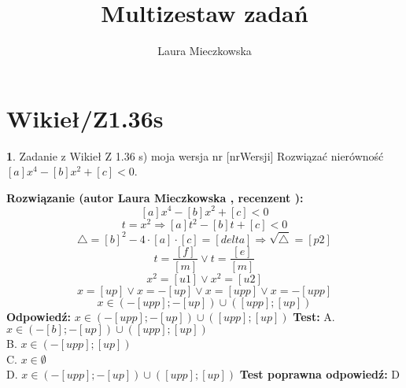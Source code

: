 \documentclass[12pt, a4paper]{article}
\title{Multizestaw zadań}
\author{Laura Mieczkowska}
\date{}
\theoremstyle{definition} %
\newtheorem{zad}{}
\newcommand{\kategoria}[1]{\section{#1}} %
\newcommand{\zadStart}[1]{\begin{zad}#1\newline} %
\newcommand{\zadStop}{\end{zad}}   %
\newcommand{\rozwStart}[2]{\noindent \textbf{Rozwiązanie (autor #1 , recenzent #2): }\newline} %
\newcommand{\odpStart}{\noindent \textbf{Odpowiedź:}\newline}    %
\newcommand{\odpStop}{\newline}                                             %
\newcommand{\testStart}{\noindent \textbf{Test:}\newline} %
\newcommand{\testStop}{\newline} %
\newcommand{\kluczStart}{\noindent \textbf{Test poprawna odpowiedź:}\newline} %
\newcommand{\kluczStop}{\newline} %
\begin{document}
\maketitle


\kategoria{Wikieł/Z1.36s}
\zadStart{Zadanie z Wikieł Z 1.36 s) moja wersja nr [nrWersji]}
Rozwiązać nierówność $[a]x^4-[b]x^2+[c]<0$.
\zadStop
\rozwStart{Laura Mieczkowska}{}
$$[a]x^4-[b]x^2+[c]<0$$
$$t=x^2 \Rightarrow [a]t^2-[b]t+[c]<0$$ 
$$\triangle=[b]^2-4\cdot[a]\cdot [c]=[delta] \Rightarrow \sqrt{\triangle}=[p2]$$
$$t=\frac{[f]}{[m]} \vee t=\frac{[e]}{[m]}$$
$$x^2=[u1] \vee x^2=[u2]$$
$$x=[up] \vee x=-[up] \vee x=[upp] \vee x=-[upp]$$
$$x\in(-[upp];-[up])\cup([upp];[up])$$
\odpStart
$x\in(-[upp];-[up])\cup([upp];[up])$
\odpStop
\testStart
A. $x\in(-[b];-[up])\cup([upp];[up])$ \\
B. $x\in(-[upp];[up])$ \\
C. $x\in\emptyset$ \\
D. $x\in(-[upp];-[up])\cup([upp];[up])$ 
\testStop
\kluczStart
D
\kluczStop
\end{document}
